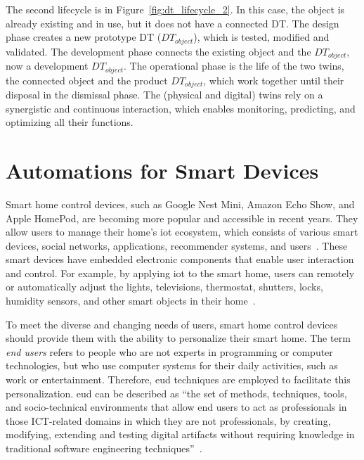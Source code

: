 The second lifecycle is in Figure~\ref{fig:dt_lifecycle_2}. In this case, the object is already existing and in use, but it does not have a connected DT. The design phase creates a new prototype DT ($DT_{object}$), which is tested, modified and validated. The development phase connects the existing object and the $DT_{object}$, now a development $DT_{object}$. The operational phase is the life of the two twins, the connected object and the product $DT_{object}$, which work together until their disposal in the dismissal phase. The (physical and digital) twins rely on a synergistic and continuous interaction, which enables monitoring, predicting, and optimizing all their functions.

\section{Automations for Smart Devices}

Smart home control devices, such as Google Nest Mini, Amazon Echo Show, and Apple HomePod, are becoming more popular and accessible in recent years. They allow users to manage their home's \acrfull{iot} ecosystem, which consists of various smart devices, social networks, applications, recommender systems, and users~\parencite{barricelliDesigningEndUserDevelopment2015}. These smart devices have embedded electronic components that enable user interaction and control. For example, by applying \acrshort{iot} to the smart home, users can remotely or automatically adjust the lights, televisions, thermostat, shutters, locks, humidity sensors, and other smart objects in their home~\parencite{kortuemSmartObjectsBuilding2010,wuRespectChangeUser2017}.

To meet the diverse and changing needs of users, smart home control devices should provide them with the ability to personalize their smart home. The term \textit{end users} refers to people who are not experts in programming or computer technologies, but who use computer systems for their daily activities, such as work or entertainment. Therefore, \acrfull{eud} techniques are employed to facilitate this personalization. \acrshort{eud} can be described as “the set of methods, techniques, tools, and socio-technical environments that allow end users to act as professionals in those ICT-related domains in which they are not professionals, by creating, modifying, extending and testing digital artifacts without requiring knowledge in traditional software engineering techniques”~\parencite{barricelliEnduserDevelopmentEnduser2019}.

